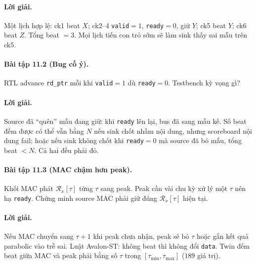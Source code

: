 \paragraph{Lời giải.} Một lịch hợp lệ: ck1 beat $X$; ck2--4 \texttt{valid}$=1$, \texttt{ready}$=0$, giữ $Y$; ck5 beat $Y$; ck6 beat $Z$. Tổng beat $=3$. Mọi lịch tiến con trỏ sớm sẽ làm sink thấy sai mẫu trên ck5.

\paragraph{Bài tập 11.2 (Bug cố ý).}
RTL advance \texttt{rd\_ptr} mỗi khi \texttt{valid}$=1$ dù \texttt{ready}$=0$. Testbench kỳ vọng gì?

\paragraph{Lời giải.} Source đã ``quên'' mẫu đang giữ: khi \texttt{ready} lên lại, bus đã sang mẫu kế. Số beat đếm được có thể vẫn bằng $N$ nếu sink chốt nhầm nội dung, nhưng scoreboard nội dung fail; hoặc nếu sink không chốt khi \texttt{ready}$=0$ mà source đã bỏ mẫu, tổng beat $<N$. Cả hai đều phải đỏ.

\paragraph{Bài tập 11.3 (MAC chậm hơn peak).}
Khối MAC phát $\mathcal{R}_x[\tau]$ từng $\tau$ sang peak. Peak cần vài chu kỳ xử lý một $\tau$ nên hạ \texttt{ready}. Chứng minh source MAC phải giữ đúng $\mathcal{R}_x[\tau]$ hiện tại.

\paragraph{Lời giải.} Nếu MAC chuyển sang $\tau+1$ khi peak chưa nhận, peak sẽ bỏ $\tau$ hoặc gắn kết quả parabolic vào trễ sai. Luật Avalon-ST: không beat thì không đổi \texttt{data}. Twin đếm beat giữa MAC và peak phải bằng số $\tau$ trong $[\tau_{\min},\tau_{\max}]$ ($189$ giá trị).
